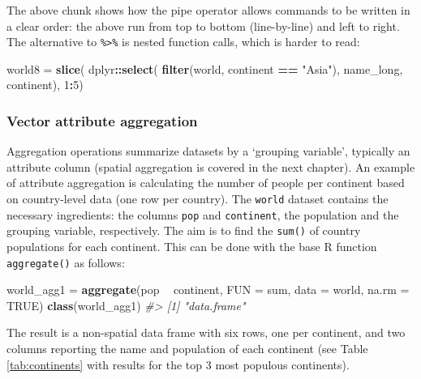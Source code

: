 \documentclass[]{krantz}
\newenvironment{Shaded}{\begin{snugshade}}{\end{snugshade}}
\newcommand{\CommentTok}[1]{\textcolor[rgb]{0.37,0.37,0.37}{\textit{#1}}}
\newcommand{\DataTypeTok}[1]{\textcolor[rgb]{0.27,0.27,0.27}{#1}}
\newcommand{\DecValTok}[1]{\textcolor[rgb]{0.06,0.06,0.06}{#1}}
\newcommand{\KeywordTok}[1]{\textcolor[rgb]{0.27,0.27,0.27}{\textbf{#1}}}
\newcommand{\NormalTok}[1]{#1}
\newcommand{\OperatorTok}[1]{\textcolor[rgb]{0.43,0.43,0.43}{\textbf{#1}}}
\newcommand{\OtherTok}[1]{\textcolor[rgb]{0.37,0.37,0.37}{#1}}
\newcommand{\StringTok}[1]{\textcolor[rgb]{0.5,0.5,0.5}{#1}}
\begin{document}
The above chunk shows how the pipe operator allows commands to be written in a clear order:
the above run from top to bottom (line-by-line) and left to right.
The alternative to \texttt{\%\textgreater{}\%} is nested function calls, which is harder to read:

\begin{Shaded}
\begin{Highlighting}[]
\NormalTok{world8 =}\StringTok{ }\KeywordTok{slice}\NormalTok{(}
\NormalTok{  dplyr}\OperatorTok{::}\KeywordTok{select}\NormalTok{(}
    \KeywordTok{filter}\NormalTok{(world, continent }\OperatorTok{==}\StringTok{ "Asia"}\NormalTok{),}
\NormalTok{    name_long, continent),}
  \DecValTok{1}\OperatorTok{:}\DecValTok{5}\NormalTok{)}
\end{Highlighting}
\end{Shaded}

\hypertarget{vector-attribute-aggregation}{%
\subsubsection{Vector attribute aggregation}\label{vector-attribute-aggregation}}

Aggregation operations summarize datasets by a `grouping variable', typically an attribute column (spatial aggregation is covered in the next chapter).
An example of attribute aggregation is calculating the number of people per continent based on country-level data (one row per country).
The \texttt{world} dataset contains the necessary ingredients: the columns \texttt{pop} and \texttt{continent}, the population and the grouping variable, respectively.
The aim is to find the \texttt{sum()} of country populations for each continent.
This can be done with the base R function \texttt{aggregate()} as follows:

\begin{Shaded}
\begin{Highlighting}[]
\NormalTok{world_agg1 =}\StringTok{ }\KeywordTok{aggregate}\NormalTok{(pop }\OperatorTok{~}\StringTok{ }\NormalTok{continent, }\DataTypeTok{FUN =}\NormalTok{ sum, }\DataTypeTok{data =}\NormalTok{ world, }\DataTypeTok{na.rm =} \OtherTok{TRUE}\NormalTok{)}
\KeywordTok{class}\NormalTok{(world_agg1)}
\CommentTok{#> [1] "data.frame"}
\end{Highlighting}
\end{Shaded}

The result is a non-spatial data frame with six rows, one per continent, and two columns reporting the name and population of each continent (see Table \ref{tab:continents} with results for the top 3 most populous continents).
\end{document}
